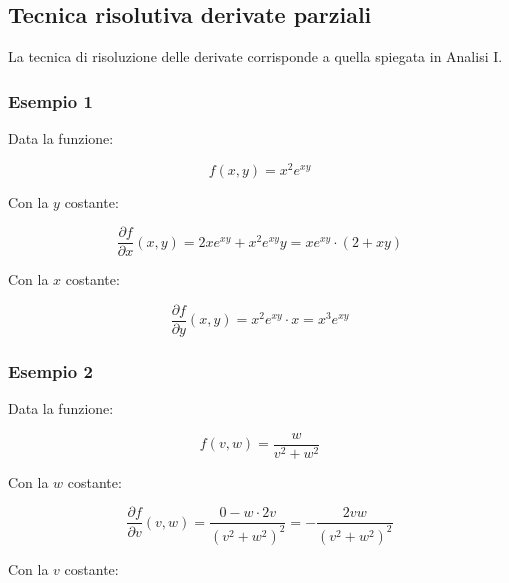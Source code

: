 \documentclass[a4paper]{article}
\begin{document}
	\newpage
	
	\subsection{Tecnica risolutiva derivate parziali}
	
	La tecnica di risoluzione delle derivate corrisponde a quella spiegata in Analisi I.
	
	\subsubsection[Esempio 1]{\textcolor{Green4}{Esempio 1}}
	
	Data la funzione:
	
	\begin{equation*}
		f\left(x,y\right) = x^{2} e^{xy}
	\end{equation*}

	\noindent
	Con la $y$ costante:
	
	\begin{equation*}
		\dfrac{\partial f}{\partial x}\left(x,y\right) = 2xe^{xy} + x^{2} e^{xy} y = xe^{xy} \cdot \left(2 + xy\right)
	\end{equation*}

	\noindent
	Con la $x$ costante:
	
	\begin{equation*}
		\dfrac{\partial f}{\partial y}\left(x,y\right) = x^{2} e^{xy} \cdot x = x^{3} e^{xy}
	\end{equation*}

	\subsubsection[Esempio 2]{\textcolor{Green4}{Esempio 2}}
	
	Data la funzione:
	
	\begin{equation*}
		f\left(v,w\right) = \dfrac{w}{v^{2} + w^{2}}
	\end{equation*}
	
	\noindent
	Con la $w$ costante:
	
	\begin{equation*}
		\dfrac{\partial f}{\partial v}\left(v,w\right) = \dfrac{0 - w \cdot 2v}{\left(v^{2} + w^{2}\right)^{2}} = - \dfrac{2 v w}{\left(v^{2} + w^{2}\right)^{2}}
	\end{equation*}
	
	\noindent
	Con la $v$ costante:
	
\end{document}
